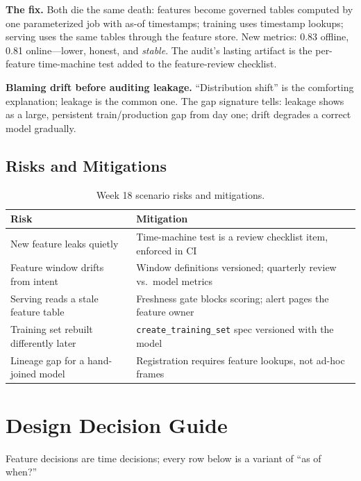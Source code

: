 \textbf{The fix.} Both die the same death: features become governed tables computed by one parameterized job with as-of timestamps; training uses timestamp lookups; serving uses the same tables through the feature store. New metrics: 0.83 offline, 0.81 online---lower, honest, and \emph{stable}. The audit's lasting artifact is the per-feature time-machine test added to the feature-review checklist.

\begin{pitfall}
\textbf{Blaming drift before auditing leakage.} ``Distribution shift'' is the comforting explanation; leakage is the common one. The gap signature tells: leakage shows as a large, persistent train/production gap from day one; drift degrades a correct model gradually.
\end{pitfall}

\subsection{Risks and Mitigations}
\begin{table}[H]
\centering
\small
\begin{tabular}{@{}p{4.6cm}p{7.6cm}@{}}
\toprule
\textbf{Risk} & \textbf{Mitigation} \\
\midrule
New feature leaks quietly & Time-machine test is a review checklist item, enforced in CI \\
Feature window drifts from intent & Window definitions versioned; quarterly review vs.\ model metrics \\
Serving reads a stale feature table & Freshness gate blocks scoring; alert pages the feature owner \\
Training set rebuilt differently later & \texttt{create\_training\_set} spec versioned with the model \\
Lineage gap for a hand-joined model & Registration requires feature lookups, not ad-hoc frames \\
\bottomrule
\end{tabular}
\caption{Week 18 scenario risks and mitigations.}
\label{tab:ch18-risks}
\end{table}

\section{Design Decision Guide}
%
Feature decisions are time decisions; every row below is a variant of ``as of when?''

